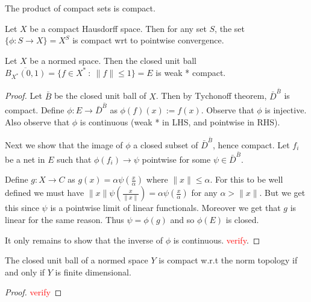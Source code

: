 
\chapter{}

\begin{theorem}[Tychonoff]
  The product of compact sets is compact.
\end{theorem}
\begin{corollary}
   Let $X$ be a compact Hausdorff space. Then for any set $S$, the set $\{ \phi: S \to X \} = X^S$ is compact wrt to pointwise convergence.
\end{corollary}

\begin{theorem}
  Let $X$ be a normed space. Then the closed unit ball $\overline{B_{X^*}(0, 1)} = \{ f \in X^* \ : \ \|f\| \le 1 \} = E$ is weak * compact.
\end{theorem}
\begin{proof}
  Let $\bar{B}$ be the closed unit ball of $X$. Then by Tychonoff theorem, $\bar{D}^{\bar{B}}$ is compact. Define $\phi: E \to \bar{D}^{\bar{B}}$ as $\phi(f)(x) := f(x)$. Observe that $\phi$ is injective.
  Also observe that $\phi$ is continuous (weak * in LHS, and pointwise in RHS).

  Next we show that the image of $\phi$ a closed subset of $\bar{D}^{ \bar{B}}$, hence compact. Let $f_i$ be a net in $E$ such that $\phi(f_i) \to \psi$ pointwise for some $\psi \in \bar{D}^{\bar{B}}$. 

  Define $g: X \to C$ as $g(x) = \alpha \psi( \frac{x}{ \alpha} )$ where $\|x\| \le \alpha$. For this to be well defined we must have $\|x\| \psi(\frac{x}{\|x\|}) = \alpha \psi( \frac{x}{ \alpha})$ for any $ \alpha >  \|x\|$. But we get this since $\psi$ is a pointwise limit of linear functionals. Moreover we get that $g$ is linear for the same reason. Thus $\psi = \phi(g)$ and so $\phi(E)$ is closed.

  It only remains to show that the inverse of $\phi$ is continuous. \textcolor{red}{verify}.
\end{proof}

\begin{remark}
  The closed unit ball of a normed space $Y$ is compact w.r.t the norm topology if and only if $Y$ is finite dimensional.
\end{remark}
\begin{proof}
   \textcolor{red}{verify}
\end{proof}

